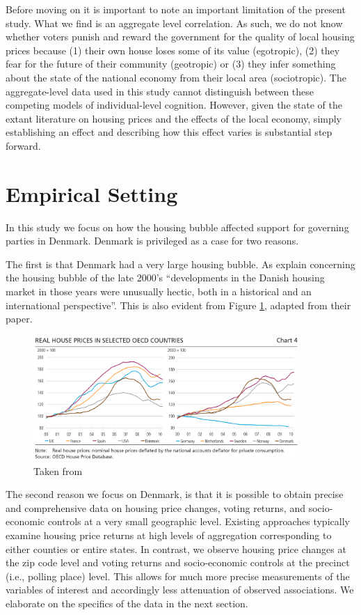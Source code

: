 \documentclass[12pt,a4paper]{article}
\begin{document}
Before moving on it is important to note an important limitation of the present study. What we find is an aggregate level correlation. As such, we do not know whether voters punish and reward the government for the quality of local housing prices  because (1) their own house loses some of its value (egotropic), (2) they fear for the future of their community (geotropic) or (3) they infer something about the state of the national economy from their local area (sociotropic). The aggregate-level data used in this study cannot distinguish between these competing models of individual-level cognition. However, given the state of the extant literature on housing prices and the effects of the local economy, simply establishing an effect and describing how this effect varies is substantial step forward. 

\section{Empirical Setting}

In this study we focus on how the housing bubble affected support for governing parties in Denmark. Denmark is privileged as a case for two reasons.

The first is that Denmark had a very large housing bubble. As \citet[][49]{dam2011housing} explain concerning the housing bubble of the late 2000's ``developments in the Danish housing market in those years were unusually hectic, both in a historical and an international perspective''. This is also evident from Figure \ref{dam}, adapted from their paper. 

\begin{figure}[htbp!]
	\includegraphics[width=0.9\textwidth]{../figures/intcomparison}
	\centering
	\caption{Taken from \citet[50]{dam2011housing}}\label{dam}
\end{figure}

The second reason we focus on Denmark, is that it is possible to obtain precise and comprehensive data on housing price changes, voting returns, and socio-economic controls at a very small geographic level. Existing approaches typically examine housing price returns at high levels of aggregation corresponding to either counties or entire states. In contrast, we observe housing price changes at the zip code level and voting returns and socio-economic controls at the precinct (i.e., polling place) level. This allows for much more precise measurements of the variables of interest and accordingly less attenuation of observed associations. We elaborate on the specifics of the data in the next section.
\end{document}
